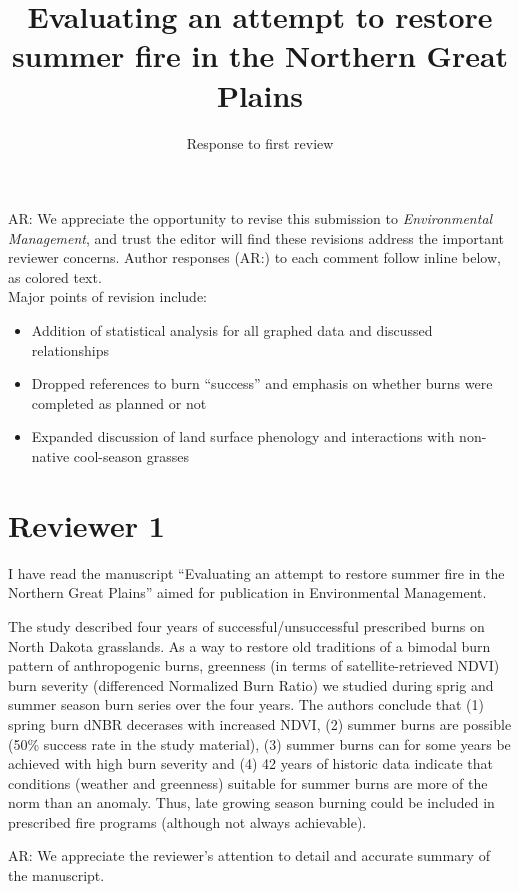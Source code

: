 \documentclass[parskip=half, american]{scrartcl}
\title{\Large Evaluating an attempt to restore summer fire in the Northern Great Plains }
\subtitle{Response to first review}
\author{ }
\date{}
\newcommand{\AR}[1]
	{\color{PineGreen}AR: #1\color{black} \par }
\newcommand{\journal}{\emph{Environmental Management}}
\begin{document}
\maketitle

\vspace{-2cm} 

\AR{We appreciate the opportunity to revise this submission to \journal, and trust the editor will find these revisions address the important reviewer concerns. 
	Author responses (AR:) to each comment follow inline below, as colored text.\\
\vspace{1em}
Major points of revision include:
\begin{itemize}
\item Addition of statistical analysis for all graphed data and discussed relationships
\item Dropped references to burn ``success'' and emphasis on whether burns were completed as planned or not
\item Expanded discussion of land surface phenology and interactions with non-native cool-season grasses
\end{itemize} }


\section*{Reviewer 1}

I have read the manuscript ``Evaluating an attempt to restore summer fire in the Northern Great Plains'' aimed for publication in Environmental Management. 

The study described four years of successful/unsuccessful prescribed burns on North Dakota grasslands. As a way to restore old traditions of a bimodal burn pattern of anthropogenic burns, greenness (in terms of satellite-retrieved NDVI) burn severity (differenced Normalized Burn Ratio) we studied during sprig and summer season burn series over the four years. The authors conclude that (1) spring burn dNBR decerases with increased NDVI, (2) summer burns are possible (50\% success rate in the study material), (3) summer burns can for some years be achieved with high burn severity and (4) 42 years of historic data indicate that conditions (weather and greenness) suitable for summer burns are more of the norm than an anomaly. Thus, late growing season burning could be included in prescribed fire programs (although not always achievable). 

\AR{We appreciate the reviewer's attention to detail and accurate summary of the manuscript. } 
\end{document}
